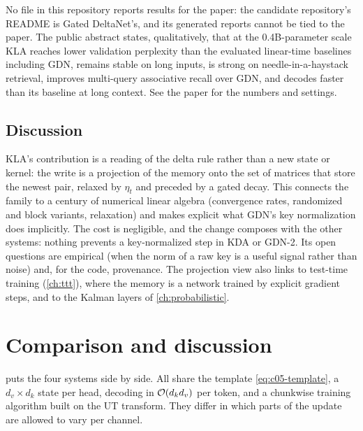 \begin{results}
No file in this repository reports results for the paper: the candidate repository's README is
Gated DeltaNet's, and its generated reports cannot be tied to the paper. The public abstract
states, qualitatively, that at the 0.4B-parameter scale KLA reaches lower validation perplexity
than the evaluated linear-time baselines including GDN, remains stable on long inputs, is strong on
needle-in-a-haystack retrieval, improves multi-query associative recall over GDN, and decodes
faster than its baseline at long context. See the paper for the numbers and settings.
\end{results}

\subsection{Discussion}

KLA's contribution is a reading of the delta rule rather than a new state or kernel: the write is a
projection of the memory onto the set of matrices that store the newest pair, relaxed by $\eta_t$
and preceded by a gated decay. This connects the family to a century of numerical linear algebra
(convergence rates, randomized and block variants, relaxation) and makes explicit what GDN's key
normalization does implicitly. The cost is negligible, and the change composes with the other
systems: nothing prevents a key-normalized step in KDA or GDN-2. Its open questions are empirical
(when the norm of a raw key is a useful signal rather than noise) and, for the code, provenance.
The projection view also links to test-time training (\cref{ch:ttt}), where the memory is a
network trained by explicit gradient steps, and to the Kalman layers of \cref{ch:probabilistic}.

\section{Comparison and discussion}\label{sec:c05-comparison}

 puts the four systems side by side. All share the template
\cref{eq:c05-template}, a $d_v\times d_k$ state per head, decoding in $\mathcal{O}(d_kd_v)$ per token,
and a chunkwise training algorithm built on the UT transform. They differ in which parts of the
update are allowed to vary per channel.

